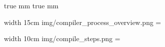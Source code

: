 


\typosize[14/20]

 true mm
 true mm

\newcount\compilerprocessoverview
\pdfximage width 15cm {img/compiler_process_overview.png}
\compilerprocessoverview=\pdflastximage

\newcount\compilesteps
\pdfximage width 10cm {img/compile_steps.png}
\compilesteps=\pdflastximage




\bye




% 
%
%
%
%
%
%
%
%
%
%
%
%
%
%
%
%
%


